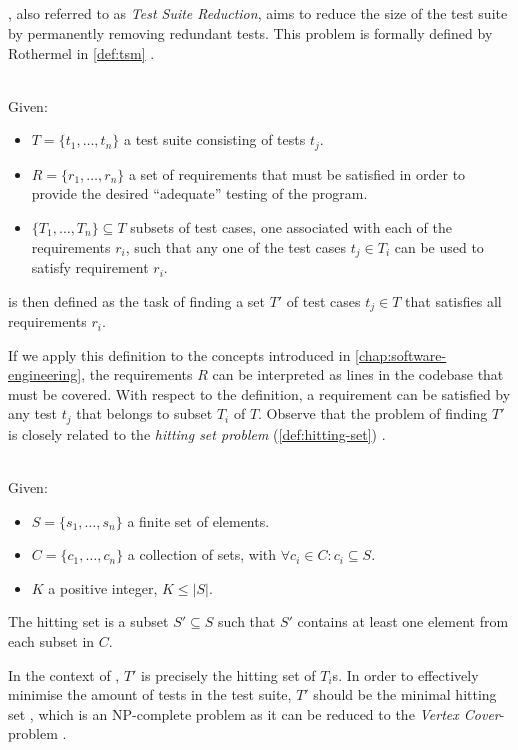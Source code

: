 
\subsection{\tsm{}}
\tsm{}, also referred to as \emph{Test Suite Reduction}, aims to reduce the size of the test suite by permanently removing redundant tests. This problem is formally defined by Rothermel in \autoref{def:tsm} \cite{10.1002/stv.430}. 

\begin{definition}[\tsm{}]
\label{def:tsm}
\mbox{}\\Given:
\begin{itemize}
	\item $T = \{t_1, \dots, t_n\}$ a test suite consisting of tests $t_j$.
	\item $R = \{r_1, \dots, r_n\}$ a set of requirements that must be satisfied in order to provide the desired ``adequate'' testing of the program.
	\item $\{T_1, \dots, T_n\} \subseteq T$ subsets of test cases, one associated with each of the requirements $r_i$, such that any one of the test cases $t_j \in T_i$ can be used to satisfy requirement $r_i$.
\end{itemize}

\noindent \tsm{} is then defined as the task of finding a set $T'$ of test cases $t_j \in T$ that satisfies all requirements $r_i$.
\end{definition}

\noindent If we apply this definition to the concepts introduced in \autoref{chap:software-engineering}, the requirements $R$ can be interpreted as lines in the codebase that must be covered. With respect to the definition, a requirement can be satisfied by any test $t_j$ that belongs to subset $T_i$ of $T$. Observe that the problem of finding $T'$ is closely related to the \emph{hitting set problem} (\autoref{def:hitting-set}) \cite{10.1002/stv.430}.

\begin{definition}
\label{def:hitting-set}
\mbox{}\\Given:
\begin{itemize}
	\item $S = \{s_1, \dots, s_n\}$ a finite set of elements.
	\item $C = \{c_1, \dots, c_n\}$ a collection of sets, with $\forall c_i \in C : c_i \subseteq S$.
	\item $K$ a positive integer, $K \le |S|$.
\end{itemize}

\noindent The hitting set is a subset $S' \subseteq S$ such that $S'$ contains at least one element from each subset in $C$.
\end{definition}

\noindent In the context of \tsm{}, $T'$ is precisely the hitting set of $T_i$s. In order to effectively minimise the amount of tests in the test suite, $T'$ should be the minimal hitting set \cite{10.1002/stv.430}, which is an NP-complete problem as it can be reduced to the \emph{Vertex Cover}-problem \cite{10.5555/574848}.